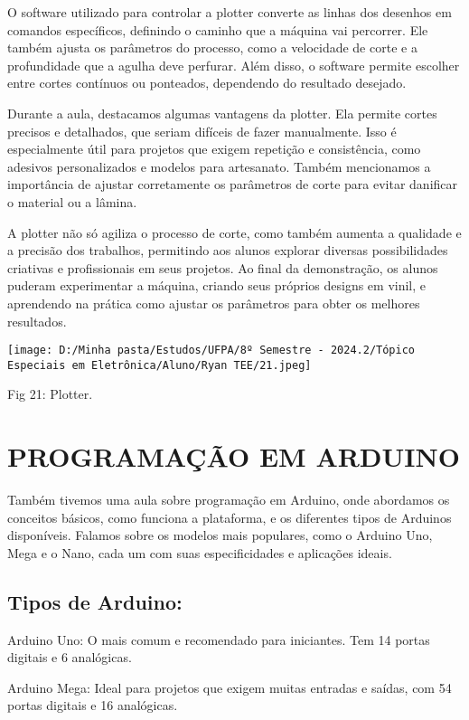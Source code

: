 \documentclass[
]{book}
\begin{document}
O software utilizado para controlar a plotter converte as linhas dos desenhos em comandos específicos, definindo o caminho que a máquina vai percorrer. Ele também ajusta os parâmetros do processo, como a velocidade de corte e a profundidade que a agulha deve perfurar. Além disso, o software permite escolher entre cortes contínuos ou ponteados, dependendo do resultado desejado.

Durante a aula, destacamos algumas vantagens da plotter. Ela permite cortes precisos e detalhados, que seriam difíceis de fazer manualmente. Isso é especialmente útil para projetos que exigem repetição e consistência, como adesivos personalizados e modelos para artesanato. Também mencionamos a importância de ajustar corretamente os parâmetros de corte para evitar danificar o material ou a lâmina.

A plotter não só agiliza o processo de corte, como também aumenta a qualidade e a precisão dos trabalhos, permitindo aos alunos explorar diversas possibilidades criativas e profissionais em seus projetos. Ao final da demonstração, os alunos puderam experimentar a máquina, criando seus próprios designs em vinil, e aprendendo na prática como ajustar os parâmetros para obter os melhores resultados.

\texttt{[image: D:/Minha pasta/Estudos/UFPA/8º Semestre - 2024.2/Tópico Especiais em Eletrônica/Aluno/Ryan TEE/21.jpeg]}

Fig 21: Plotter.

\chapter{PROGRAMAÇÃO EM ARDUINO}\label{programauxe7uxe3o-em-arduino}

Também tivemos uma aula sobre programação em Arduino, onde abordamos os conceitos básicos, como funciona a plataforma, e os diferentes tipos de Arduinos disponíveis. Falamos sobre os modelos mais populares, como o Arduino Uno, Mega e o Nano, cada um com suas especificidades e aplicações ideais.

\section{Tipos de Arduino:}\label{tipos-de-arduino}

Arduino Uno: O mais comum e recomendado para iniciantes. Tem 14 portas digitais e 6 analógicas.

Arduino Mega: Ideal para projetos que exigem muitas entradas e saídas, com 54 portas digitais e 16 analógicas.
\end{document}
